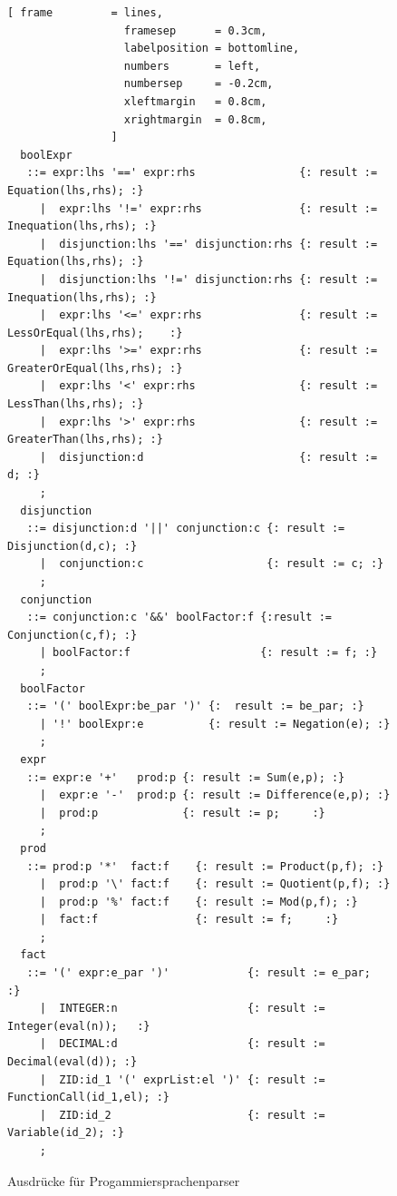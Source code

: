 \begin{figure}[!ht]

\begin{Verbatim}[ frame         = lines, 
                  framesep      = 0.3cm, 
                  labelposition = bottomline,
                  numbers       = left,
                  numbersep     = -0.2cm,
                  xleftmargin   = 0.8cm,
                  xrightmargin  = 0.8cm,
                ]
  boolExpr 
   ::= expr:lhs '==' expr:rhs                {: result := Equation(lhs,rhs); :}
     |  expr:lhs '!=' expr:rhs               {: result := Inequation(lhs,rhs); :}
     |  disjunction:lhs '==' disjunction:rhs {: result := Equation(lhs,rhs); :}
     |  disjunction:lhs '!=' disjunction:rhs {: result := Inequation(lhs,rhs); :}
     |  expr:lhs '<=' expr:rhs               {: result := LessOrEqual(lhs,rhs);    :}
     |  expr:lhs '>=' expr:rhs               {: result := GreaterOrEqual(lhs,rhs); :}
     |  expr:lhs '<' expr:rhs                {: result := LessThan(lhs,rhs); :}
     |  expr:lhs '>' expr:rhs                {: result := GreaterThan(lhs,rhs); :}
     |  disjunction:d                        {: result := d; :}
     ;
  disjunction
   ::= disjunction:d '||' conjunction:c {: result := Disjunction(d,c); :}
     |  conjunction:c                   {: result := c; :}
     ;
  conjunction
   ::= conjunction:c '&&' boolFactor:f {:result := Conjunction(c,f); :}
     | boolFactor:f                    {: result := f; :}
     ;
  boolFactor
   ::= '(' boolExpr:be_par ')' {:  result := be_par; :}
     | '!' boolExpr:e          {: result := Negation(e); :}
     ;
  expr 
   ::= expr:e '+'   prod:p {: result := Sum(e,p); :} 
     |  expr:e '-'  prod:p {: result := Difference(e,p); :} 
     |  prod:p             {: result := p;     :}
     ;
  prod 
   ::= prod:p '*'  fact:f    {: result := Product(p,f); :}
     |  prod:p '\' fact:f    {: result := Quotient(p,f); :} 
     |  prod:p '%' fact:f    {: result := Mod(p,f); :} 
     |  fact:f               {: result := f;     :}
     ;
  fact 
   ::= '(' expr:e_par ')'            {: result := e_par;   :} 
     |  INTEGER:n                    {: result := Integer(eval(n));   :} 
     |  DECIMAL:d                    {: result := Decimal(eval(d)); :}
     |  ZID:id_1 '(' exprList:el ')' {: result := FunctionCall(id_1,el); :}
     |  ZID:id_2                     {: result := Variable(id_2); :}
     ;
		\end{Verbatim}
\caption{Ausdrücke für Progammiersprachenparser}
\label{fig:example_interpreter_grammar_expression}
\end{figure}
